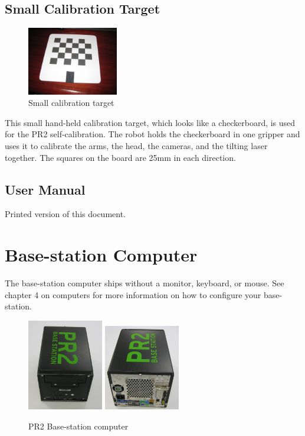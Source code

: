 \subsection{Small Calibration Target}
\begin{figure}[h!]
\centering
\includegraphics[width=150px]{images/hand_checkerboard.png}
\caption{Small calibration target}
\label{fig:hand_checkerboard}
\end{figure}
\label{hand_checkerboard}

This small hand-held calibration target, which looks
like a checkerboard, is used for the PR2 self-calibration.  The robot holds the
checkerboard in one gripper and uses it to calibrate the arms, the head, the
cameras, and the tilting laser together.  The squares on the board are 25mm in each direction.

\subsection{User Manual}
Printed version of this document.


\section{Base-station Computer}
The base-station computer ships without a monitor, keyboard, or mouse.  
See chapter 4 on computers for more information on how to configure your base-station.

\begin{figure}[h!]
\centering
\includegraphics[width=125px]{images/basestation.png}
\includegraphics[width=125px]{images/basestation_back.png}
\caption{PR2 Base-station computer}
\label{fig:basestation}
\end{figure}
\label{basestation}


